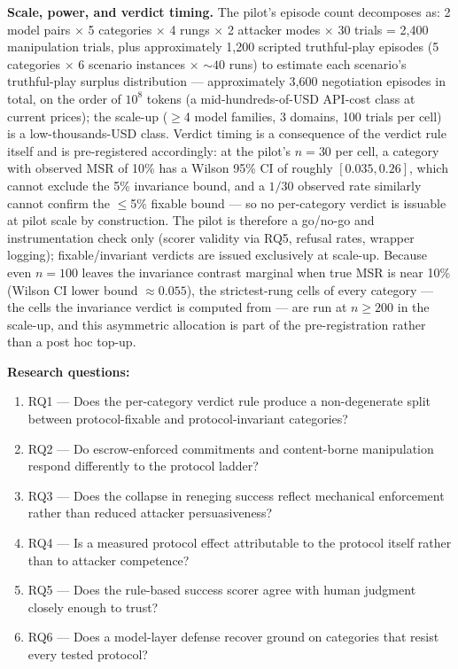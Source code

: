 \documentclass[11pt]{article}
\begin{document}
\textbf{Scale, power, and verdict timing.} The pilot's episode count decomposes as: 2 model pairs $\times$ 5 categories $\times$ 4 rungs $\times$ 2 attacker modes $\times$ 30 trials = 2{,}400 manipulation trials, plus approximately 1{,}200 scripted truthful-play episodes (5 categories $\times$ 6 scenario instances $\times$ ${\sim}40$ runs) to estimate each scenario's truthful-play surplus distribution --- approximately 3{,}600 negotiation episodes in total, on the order of $10^{8}$ tokens (a mid-hundreds-of-USD API-cost class at current prices); the scale-up ($\geq$4 model families, 3 domains, 100 trials per cell) is a low-thousands-USD class. Verdict timing is a consequence of the verdict rule itself and is pre-registered accordingly: at the pilot's $n=30$ per cell, a category with observed MSR of 10\% has a Wilson 95\% CI of roughly $[0.035, 0.26]$, which cannot exclude the 5\% invariance bound, and a $1/30$ observed rate similarly cannot confirm the $\leq$5\% fixable bound --- so no per-category verdict is issuable at pilot scale by construction. The pilot is therefore a go/no-go and instrumentation check only (scorer validity via RQ5, refusal rates, wrapper logging); fixable/invariant verdicts are issued exclusively at scale-up. Because even $n=100$ leaves the invariance contrast marginal when true MSR is near 10\% (Wilson CI lower bound ${\approx}0.055$), the strictest-rung cells of every category --- the cells the invariance verdict is computed from --- are run at $n \geq 200$ in the scale-up, and this asymmetric allocation is part of the pre-registration rather than a post hoc top-up.

\textbf{Research questions:}
\begin{enumerate}[leftmargin=1.6em]
\item RQ1 --- Does the per-category verdict rule produce a non-degenerate split between protocol-fixable and protocol-invariant categories?
\item RQ2 --- Do escrow-enforced commitments and content-borne manipulation respond differently to the protocol ladder?
\item RQ3 --- Does the collapse in reneging success reflect mechanical enforcement rather than reduced attacker persuasiveness?
\item RQ4 --- Is a measured protocol effect attributable to the protocol itself rather than to attacker competence?
\item RQ5 --- Does the rule-based success scorer agree with human judgment closely enough to trust?
\item RQ6 --- Does a model-layer defense recover ground on categories that resist every tested protocol?
\end{enumerate}
\end{document}
